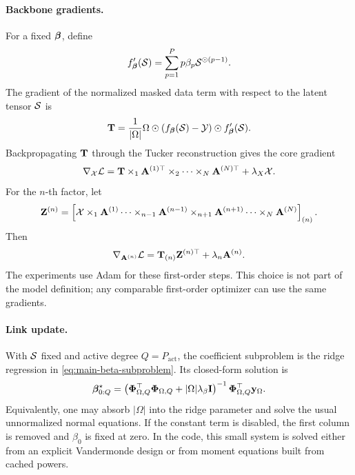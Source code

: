 \paragraph{Backbone gradients.}
For a fixed \(\boldsymbol{\beta}\), define
\begin{equation}
  f_{\boldsymbol{\beta}}'(\mathcal{S})
  =
  \sum_{p=1}^{P}p\beta_p\mathcal{S}^{\odot(p-1)}.
\end{equation}
The gradient of the normalized masked data term with respect to the latent
tensor \(\mathcal{S}\) is
\begin{equation}
  \mathbf{T} =
  \frac{1}{|\Omega|}
  \Omega \odot
  \left(f_{\boldsymbol{\beta}}(\mathcal{S})-\mathcal{Y}\right)
  \odot f_{\boldsymbol{\beta}}'(\mathcal{S}).
  \label{eq:appendix-latent-gradient}
\end{equation}
Backpropagating \(\mathbf{T}\) through the Tucker reconstruction gives the core
gradient
\begin{equation}
  \nabla_{\mathcal{X}}\mathcal L
  =
  \mathbf{T}
  \times_1 \mathbf{A}^{(1)\top}
  \times_2 \cdots
  \times_N \mathbf{A}^{(N)\top}
  +
  \lambda_X\mathcal{X}.
\end{equation}
For the \(n\)-th factor, let
\begin{equation}
  \mathbf{Z}^{(n)}
  =
  \left[
  \mathcal{X}
  \times_1 \mathbf{A}^{(1)}
  \cdots
  \times_{n-1}\mathbf{A}^{(n-1)}
  \times_{n+1}\mathbf{A}^{(n+1)}
  \cdots
  \times_N \mathbf{A}^{(N)}
  \right]_{(n)} .
\end{equation}
Then
\begin{equation}
  \nabla_{\mathbf{A}^{(n)}}\mathcal L
  =
  \mathbf{T}_{(n)}\mathbf{Z}^{(n)\top}
  +
  \lambda_n\mathbf{A}^{(n)}.
\end{equation}
The experiments use Adam for these first-order steps. This choice is not part
of the model definition; any comparable first-order optimizer can use the same
gradients.

\paragraph{Link update.}
With \(\mathcal{S}\) fixed and active degree \(Q=P_{\mathrm{act}}\), the coefficient
subproblem is the ridge regression in \eqref{eq:main-beta-subproblem}. Its
closed-form solution is
\begin{equation}
  \boldsymbol{\beta}_{0:Q}^\star =
  \left(
  \boldsymbol{\Phi}_{\Omega,Q}^\top\boldsymbol{\Phi}_{\Omega,Q}
  +
  |\Omega|\lambda_\beta\mathbf{I}
  \right)^{-1}
  \boldsymbol{\Phi}_{\Omega,Q}^\top\mathbf{y}_\Omega .
  \label{eq:appendix-beta-ridge-update}
\end{equation}
Equivalently, one may absorb \(|\Omega|\) into the ridge parameter and solve
the usual unnormalized normal equations. If the constant term is disabled, the
first column is removed and \(\beta_0\) is fixed at zero. In the code, this
small system is solved either from an explicit Vandermonde design or from
moment equations built from cached powers.

